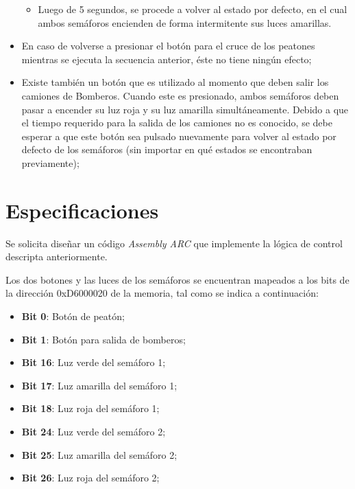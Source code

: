 \documentclass{article}
\begin{document}
\begin{itemize}
\begin{itemize}
		\item \noindent Luego de 5 segundos, se procede a volver al estado por defecto, en el cual ambos semáforos encienden de forma intermitente sus luces amarillas.

	\end{itemize}

	\item \noindent En caso de volverse a presionar el botón para el cruce de los peatones mientras se ejecuta la secuencia anterior, éste no tiene ningún efecto;

	\item \noindent Existe también un botón que es utilizado al momento que deben salir los camiones de Bomberos. Cuando este es presionado, ambos semáforos deben pasar a encender su luz roja y su luz amarilla simultáneamente. Debido a que el tiempo requerido para la salida de los camiones no es conocido, se debe esperar a que este botón sea pulsado nuevamente para volver al estado por defecto de los semáforos (sin importar en qué estados se encontraban previamente);

\end{itemize}
\bigskip\bigskip




\section{Especificaciones}
\medskip

	Se solicita diseñar un código \textit{Assembly ARC} que implemente la lógica de control descripta anteriormente.
	\par
	Los dos botones y las luces de los semáforos se encuentran mapeados a los bits de la dirección 0xD6000020 de la memoria, tal como se indica a continuación:
	\medskip

	\begin{itemize}
	\itemsep=2pt \topsep=0pt \partopsep=0pt \parskip=0pt \parsep=0pt

		\item \textbf{Bit 0}: Botón de peatón;
		\item \textbf{Bit 1}: Botón para salida de bomberos;\\
		\item \textbf{Bit 16}: Luz verde del semáforo 1;
		\item \textbf{Bit 17}: Luz amarilla del semáforo 1;
		\item \textbf{Bit 18}: Luz roja del semáforo 1;\\
		\item \textbf{Bit 24}: Luz verde del semáforo 2;
		\item \textbf{Bit 25}: Luz amarilla del semáforo 2;
		\item \textbf{Bit 26}: Luz roja del semáforo 2;

	\end{itemize}
	\bigskip
\end{document}
